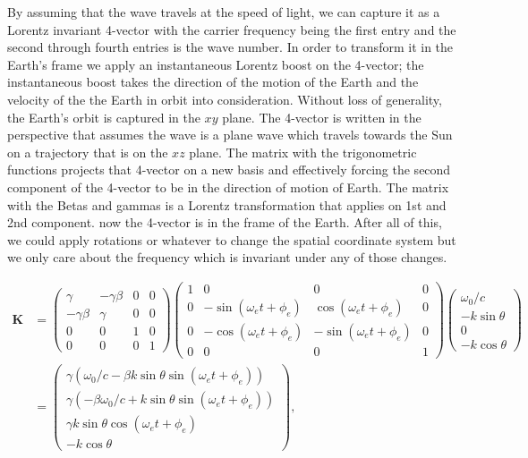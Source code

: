 \documentclass[onecolumn, groupedaddress, 10pt]{revtex4-1}
\begin{document}
By assuming that the wave travels at the speed of light, we can capture it as a Lorentz invariant 4-vector with the carrier frequency being the first entry and the second through fourth entries is the wave number. In order to transform it in the Earth's frame we apply an instantaneous Lorentz boost on the 4-vector; the instantaneous boost takes the direction of the motion of the Earth and the velocity of the the Earth in orbit into consideration. Without loss of generality, the Earth's orbit is captured in the $xy$ plane. The 4-vector is written in the perspective that assumes the wave is a plane wave which travels towards the Sun on a trajectory that is on the $xz$ plane. The matrix with the trigonometric functions projects that 4-vector on a new basis and effectively forcing the second component of the 4-vector to be in the direction of motion of Earth. The matrix with the Betas and gammas is a Lorentz transformation that applies on 1st and 2nd component. now the 4-vector is in the frame of the Earth. After all of this, we could apply rotations or whatever to change the spatial coordinate system but we only care about the frequency which is invariant under any of those changes.

\begin{align}
\label{eqn: new k}
\mathbf{K} &=
\left( \begin{array}{cccc}
	    \gamma   & -\gamma \beta & 0 & 0 \\
	-\gamma \beta &    \gamma    & 0 & 0 \\
	      0      &       0      & 1 & 0 \\
	      0      &       0      & 0 & 1
\end{array} \right)
\left( \begin{array}{cccc}
	1 &               0             &              0               & 0 \\
	0 & -\sin (\omega_e t + \phi_e) &  \cos (\omega_e t + \phi_e)  & 0 \\
	0 & -\cos (\omega_e t + \phi_e) &  -\sin (\omega_e t + \phi_e) & 0 \\
	0 &               0             &              0               & 1
\end{array} \right)							 
\left( \begin{array}{c}	
	   \omega_0 / c   \\
	- k \sin \theta \\
	        0       \\
	- k \cos \theta    
\end{array} \right)																			\\
&=
\left( \begin{array}{c}
	\gamma \left(\omega_0 / c - \beta k \sin \theta \sin (\omega_e t + \phi_e)\right) \\
	\gamma \left(-\beta \omega_0 / c + k \sin \theta \sin (\omega_e t + \phi_e)\right) \\
	           \gamma k \sin \theta \cos (\omega_e t + \phi_e)           \\
	                           - k \cos \theta
\end{array} \right)   ,
\end{align}
\end{document}
